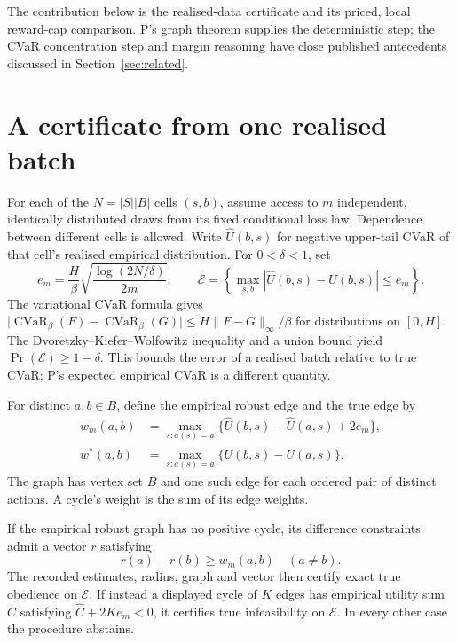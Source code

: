 \documentclass{article}
\begin{document}
The contribution below is the realised-data certificate and its priced,
local reward-cap comparison. P's graph theorem supplies the deterministic
step; the CVaR concentration step and margin reasoning have close published
antecedents discussed in Section~\ref{sec:related}.

\section{A certificate from one realised batch}

For each of the \(N=|S||B|\) cells \((s,b)\), assume access to \(m\)
independent, identically distributed draws from its fixed conditional loss
law. Dependence between different cells is allowed. Write
\(\widehat U(b,s)\) for negative upper-tail CVaR of that cell's realised
empirical distribution. For \(0<\delta<1\), set
\[
e_m=\frac{H}{\beta}
\sqrt{\frac{\log(2N/\delta)}{2m}},\qquad
\mathcal E=\left\{
\max_{s,b}|\widehat U(b,s)-U(b,s)|\leq e_m
\right\}.
\]
The variational CVaR formula gives
\(\lvert\operatorname{CVaR}_{\beta}(F)
-\operatorname{CVaR}_{\beta}(G)\rvert
\leq H\|F-G\|_{\infty}/\beta\) for distributions on \([0,H]\).
The Dvoretzky--Kiefer--Wolfowitz inequality and a union bound yield
\(\Pr(\mathcal E)\geq1-\delta\). This bounds the error of a realised
batch relative to true CVaR; P's expected empirical CVaR is a different
quantity.

For distinct \(a,b\in B\), define the empirical robust edge and the true
edge by
\[
\begin{aligned}
w_m(a,b)&=\max_{s:a(s)=a}
\{\widehat U(b,s)-\widehat U(a,s)+2e_m\},\\
w^*(a,b)&=\max_{s:a(s)=a}
\{U(b,s)-U(a,s)\}.
\end{aligned}
\]
The graph has vertex set \(B\) and one such edge for each ordered pair of
distinct actions. A cycle's weight is the sum of its edge weights.

\begin{theorem}\label{thm:certificate}
If the empirical robust graph has no positive cycle, its difference
constraints admit a vector \(r\) satisfying
\[
r(a)-r(b)\geq w_m(a,b)\quad(a\ne b).
\]
The recorded estimates, radius, graph and vector then certify exact true
obedience on \(\mathcal E\). If instead a displayed cycle of \(K\) edges
has empirical utility sum \(\widehat C\) satisfying
\(\widehat C+2Ke_m<0\), it certifies true infeasibility on
\(\mathcal E\). In every other case the procedure abstains.
\end{theorem}
\end{document}
